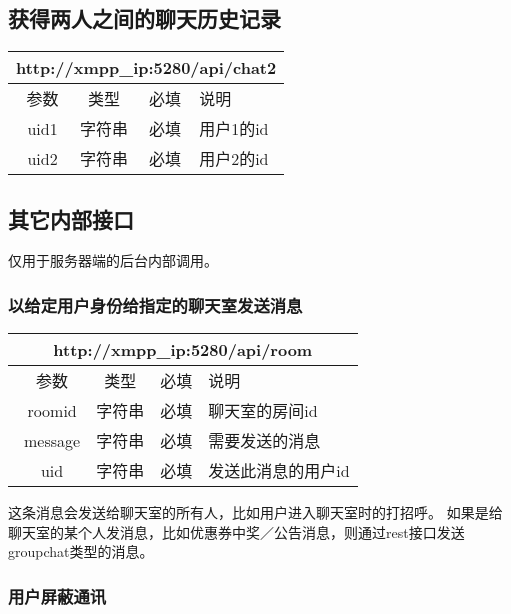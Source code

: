 \documentclass[cs4size]{ctexartutf8}
\begin{document}
\subsection{获得两人之间的聊天历史记录}

\begin{table}[H]
   \begin{center}
\begin{tabular}{|c|c|c|p{12cm}|}
\hline
\multicolumn{4}{|c|}{http://xmpp\_ip:5280/api/chat2} \\
\hline\hline
 \  参数  & 类型 & 必填 &  说明  \\
\hline
 \  uid1  & 字符串 & 必填 &  用户1的id  \\
\hline
 \  uid2  & 字符串 & 必填 &  用户2的id  \\
\hline
\end{tabular}
   \end{center}
\end{table}

\subsection{其它内部接口}
仅用于服务器端的后台内部调用。

\subsubsection{以给定用户身份给指定的聊天室发送消息}

\begin{table}[H]
   \begin{center}
\begin{tabular}{|c|c|c|p{12cm}|}
\hline
\multicolumn{4}{|c|}{http://xmpp\_ip:5280/api/room} \\
\hline\hline
 \  参数  & 类型 & 必填 &  说明  \\
\hline
 \  roomid  & 字符串 & 必填 &  聊天室的房间id  \\
\hline
 \  message  & 字符串 & 必填 &  需要发送的消息  \\
\hline
 \  uid  & 字符串 & 必填 &  发送此消息的用户id  \\
\hline
\end{tabular}
   \end{center}
\end{table}
这条消息会发送给聊天室的所有人，比如用户进入聊天室时的打招呼。
如果是给聊天室的某个人发消息，比如优惠券中奖／公告消息，则通过rest接口发送groupchat类型的消息。

\subsubsection{用户屏蔽通讯}
\end{document}
